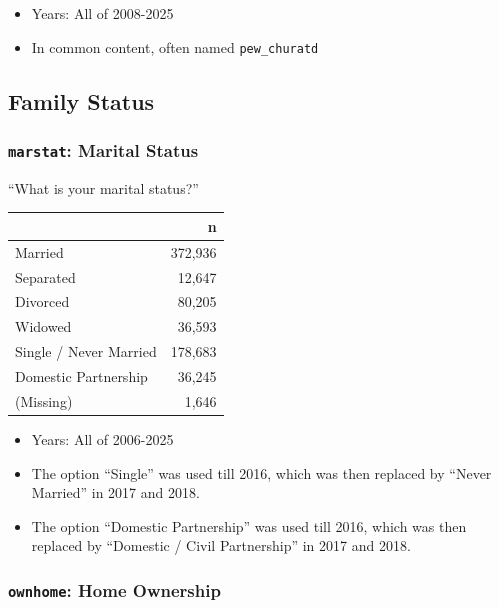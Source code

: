 \documentclass[10pt,article,oneside]{memoir}
\begin{document}
\begin{itemize}
\tightlist
\item
  Years: All of 2008-2025
\item
  In common content, often named \texttt{pew\_churatd}
\end{itemize}

\subsection{Family Status}\label{family-status}

\subsubsection{\texorpdfstring{\texttt{marstat}: Marital
Status}{marstat: Marital Status}}\label{marstat-marital-status}

``What is your marital status?''

\begin{table}[H]
\centering
\begin{tabular}[t]{lr}
\toprule
 & n\\
\midrule
Married & 372,936\\
Separated & 12,647\\
Divorced & 80,205\\
Widowed & 36,593\\
Single / Never Married & 178,683\\
Domestic Partnership & 36,245\\
(Missing) & 1,646\\
\bottomrule
\end{tabular}
\end{table}

\begin{itemize}
\tightlist
\item
  Years: All of 2006-2025
\item
  The option ``Single'' was used till 2016, which was then replaced by
  ``Never Married'' in 2017 and 2018.
\item
  The option ``Domestic Partnership'' was used till 2016, which was then
  replaced by ``Domestic / Civil Partnership'' in 2017 and 2018.
\end{itemize}

\subsubsection{\texorpdfstring{\texttt{ownhome}: Home
Ownership}{ownhome: Home Ownership}}\label{ownhome-home-ownership}
\end{document}
